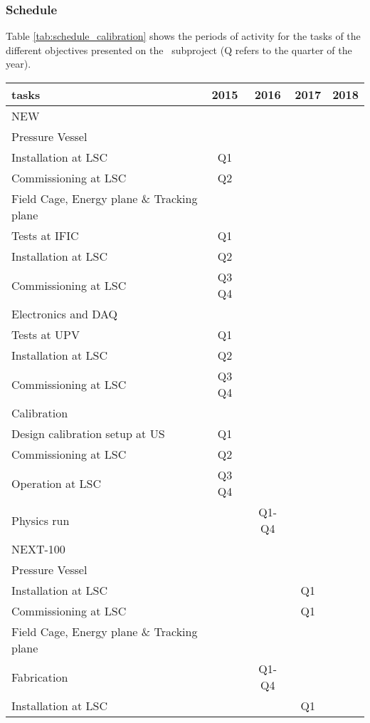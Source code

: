 

\subsubsection*{Schedule}

Table \ref{tab:schedule_calibration} shows the periods of activity for the tasks of the different objectives presented on the  \BATA\ subproject (Q refers to the quarter of the year).

\begin{center}
\begin{tabular}{| l | c | c | c | c |}
\hline
tasks & 2015 & 2016 & 2017 & 2018 \\
\hline
\hline
\multicolumn{5}{|l|}{NEW}  \\
\hline
\hline
Pressure Vessel & & & &   \\
\hline
Installation at LSC & Q1 & & & \\
Commissioning at LSC & Q2 & & & \\
\hline
Field Cage, Energy plane \& Tracking plane & & & &   \\
\hline
Tests at IFIC & Q1 & & & \\
Installation at LSC & Q2 & & & \\
Commissioning at LSC & Q3 Q4 & & & \\
\hline
Electronics and DAQ & & & &   \\
\hline
Tests at UPV & Q1 & & & \\
Installation at LSC & Q2 & & & \\
Commissioning at LSC & Q3 Q4 & & & \\
\hline
Calibration & & & &   \\
\hline
Design calibration setup at US & Q1 & & & \\
Commissioning at LSC & Q2 & & & \\
Operation at LSC & Q3 Q4 & & & \\
\hline
Physics run & & Q1-Q4& &   \\
\hline
\multicolumn{5}{|l|}{NEXT-100}  \\
\hline
\hline
Pressure Vessel & & & &   \\
\hline
Installation at LSC &  & & Q1& \\
Commissioning at LSC & & &Q1 & \\
\hline
Field Cage, Energy plane \& Tracking plane & & & &  \\
\hline
Fabrication & & Q1-Q4 & & \\
Installation at LSC &  & &Q1 & \\

\end{tabular}
\end{center}
